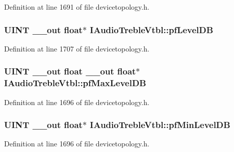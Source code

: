 Definition at line 1691 of file devicetopology.\+h.

\subsubsection[{\texorpdfstring{pf\+Level\+DB}{pfLevelDB}}]{ {\bf U\+I\+NT} {\bf \+\_\+\+\_\+out} float$\ast$ I\+Audio\+Treble\+Vtbl\+::pf\+Level\+DB}\hypertarget{struct_i_audio_treble_vtbl_ac511d1a747c7816ab5b8310e9af3ccd6}{}\label{struct_i_audio_treble_vtbl_ac511d1a747c7816ab5b8310e9af3ccd6}


Definition at line 1707 of file devicetopology.\+h.

\subsubsection[{\texorpdfstring{pf\+Max\+Level\+DB}{pfMaxLevelDB}}]{ {\bf U\+I\+NT} {\bf \+\_\+\+\_\+out} float {\bf \+\_\+\+\_\+out} float$\ast$ I\+Audio\+Treble\+Vtbl\+::pf\+Max\+Level\+DB}\hypertarget{struct_i_audio_treble_vtbl_a060263becbaa220496a2344e9ded87d4}{}\label{struct_i_audio_treble_vtbl_a060263becbaa220496a2344e9ded87d4}


Definition at line 1696 of file devicetopology.\+h.

\subsubsection[{\texorpdfstring{pf\+Min\+Level\+DB}{pfMinLevelDB}}]{ {\bf U\+I\+NT} {\bf \+\_\+\+\_\+out} float$\ast$ I\+Audio\+Treble\+Vtbl\+::pf\+Min\+Level\+DB}\hypertarget{struct_i_audio_treble_vtbl_a63a11fd3136bbbd26bdfccfa9379296f}{}\label{struct_i_audio_treble_vtbl_a63a11fd3136bbbd26bdfccfa9379296f}


Definition at line 1696 of file devicetopology.\+h.


